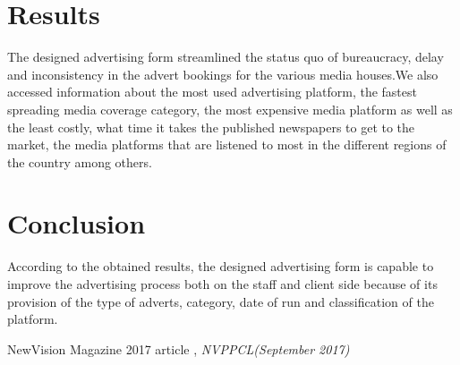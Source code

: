 \documentclass[11pt,A4paper]{article}
\begin{document}
\section{\textbf{Results}}
The designed advertising form streamlined  the status quo of bureaucracy, delay and inconsistency in the advert bookings for the various media houses.We also accessed information about the most used advertising platform, the fastest spreading media coverage category, the most expensive media platform as well as the least costly, what time it takes the published newspapers to get to the market, the media platforms that are listened to most in the different regions of the country among others.

\section{\textbf{Conclusion}}
According to the obtained results, the designed advertising form is capable to improve the advertising process both on the staff and client side because of its provision of the type of adverts, category, date of run and classification of the platform. 
\begin{thebibliography}{10} NewVision Magazine 2017 article , \emph{NVPPCL(September 2017)} \end{thebibliography}
\end{document}
